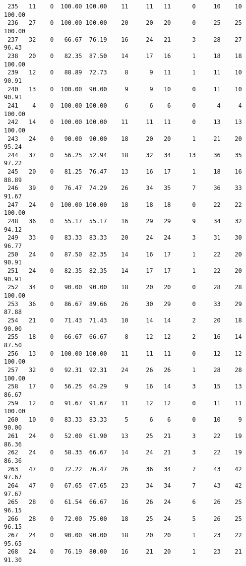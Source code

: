 \begin{verbatim}
 235   11    0  100.00 100.00    11     11   11      0     10    10   100.00
 236   27    0  100.00 100.00    20     20   20      0     25    25   100.00
 237   32    0   66.67  76.19    16     24   21      3     28    27    96.43
 238   20    0   82.35  87.50    14     17   16      1     18    18   100.00
 239   12    0   88.89  72.73     8      9   11      1     11    10    90.91
 240   13    0  100.00  90.00     9      9   10      0     11    10    90.91
 241    4    0  100.00 100.00     6      6    6      0      4     4   100.00
 242   14    0  100.00 100.00    11     11   11      0     13    13   100.00
 243   24    0   90.00  90.00    18     20   20      1     21    20    95.24
 244   37    0   56.25  52.94    18     32   34     13     36    35    97.22
 245   20    0   81.25  76.47    13     16   17      1     18    16    88.89
 246   39    0   76.47  74.29    26     34   35      7     36    33    91.67
 247   24    0  100.00 100.00    18     18   18      0     22    22   100.00
 248   36    0   55.17  55.17    16     29   29      9     34    32    94.12
 249   33    0   83.33  83.33    20     24   24      3     31    30    96.77
 250   24    0   87.50  82.35    14     16   17      1     22    20    90.91
 251   24    0   82.35  82.35    14     17   17      1     22    20    90.91
 252   34    0   90.00  90.00    18     20   20      0     28    28   100.00
 253   36    0   86.67  89.66    26     30   29      0     33    29    87.88
 254   21    0   71.43  71.43    10     14   14      2     20    18    90.00
 255   18    0   66.67  66.67     8     12   12      2     16    14    87.50
 256   13    0  100.00 100.00    11     11   11      0     12    12   100.00
 257   32    0   92.31  92.31    24     26   26      1     28    28   100.00
 258   17    0   56.25  64.29     9     16   14      3     15    13    86.67
 259   12    0   91.67  91.67    11     12   12      0     11    11   100.00
 260   10    0   83.33  83.33     5      6    6      0     10     9    90.00
 261   24    0   52.00  61.90    13     25   21      3     22    19    86.36
 262   24    0   58.33  66.67    14     24   21      3     22    19    86.36
 263   47    0   72.22  76.47    26     36   34      7     43    42    97.67
 264   47    0   67.65  67.65    23     34   34      7     43    42    97.67
 265   28    0   61.54  66.67    16     26   24      6     26    25    96.15
 266   28    0   72.00  75.00    18     25   24      5     26    25    96.15
 267   24    0   90.00  90.00    18     20   20      1     23    22    95.65
 268   24    0   76.19  80.00    16     21   20      1     23    21    91.30

\end{verbatim}
